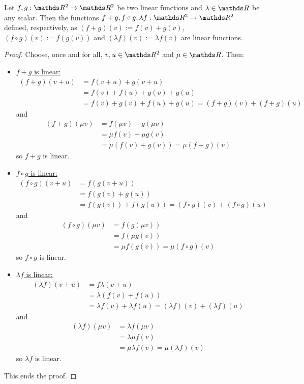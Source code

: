 \begin{prop}
	Let $f,g:\R^2\to\R^2$ be two linear functions and $\lambda\in \R$  be any scalar. Then the functions $f+g,f\circ g,\lambda f:\R^2\to\R^2$ defined, respectively, as $(f+g)(v):=f(v)+g(v)$, $(f\circ g)(v):=f(g(v))$ and $(\lambda f)(v):=\lambda f(v)$ are linear functions.
\end{prop}
\begin{proof}
	Choose, once and for all, $v,u\in \R^2$ and $\mu\in \R$. Then:
	\begin{itemize}
		\item \underline{$f+g$ is linear:}		
		\begin{align*}
			(f+g)(v+u)&=f(v+u)+g(v+u)\\
			&=f(v)+f(u)+g(v)+g(u)\\
			&=f(v)+g(v)+f(u)+g(u)=(f+g)(v)+(f+g)(u)
		\end{align*}and
		\begin{align*}
			(f+g)(\mu v)&=f(\mu v)+g(\mu v)\\
			&=\mu f(v)+\mu g(v)\\
			&=\mu(f(v)+g(v))=\mu(f+g)(v)
		\end{align*}so $f+g$ is linear.
		
		\item \underline{$f\circ g$ is linear:}		
		\begin{align*}
			(f\circ g)(v+u)&=f(g(v+u))\\
			&=f(g(v)+g(u))\\
			&=f(g(v))+f(g(u))=(f\circ g)(v)+(f\circ g)(u)
		\end{align*}and
		\begin{align*}
			(f\circ g)(\mu v)&=f(g(\mu v))\\
			&=f(\mu g(v))\\
			&=\mu f(g(v))=\mu(f\circ g)(v)
		\end{align*}so $f\circ g$ is linear.
		
		\item \underline{$\lambda f$ is linear:}
		\begin{align*}
			(\lambda f)(v+u)&=f\lambda(v+u)\\
			&=\lambda (f(v)+f(u))\\
			&=\lambda f(v)+\lambda f(u)=(\lambda f)(v)+(\lambda f)(u)
		\end{align*}and
		\begin{align*}
			(\lambda f)(\mu v)&=\lambda f(\mu v)\\
			&=\lambda \mu f(v)\\
			&=\mu\lambda f(v)=\mu(\lambda f)(v)
		\end{align*}so $\lambda f$ is linear.
	\end{itemize}

This ends the proof.
\end{proof}

